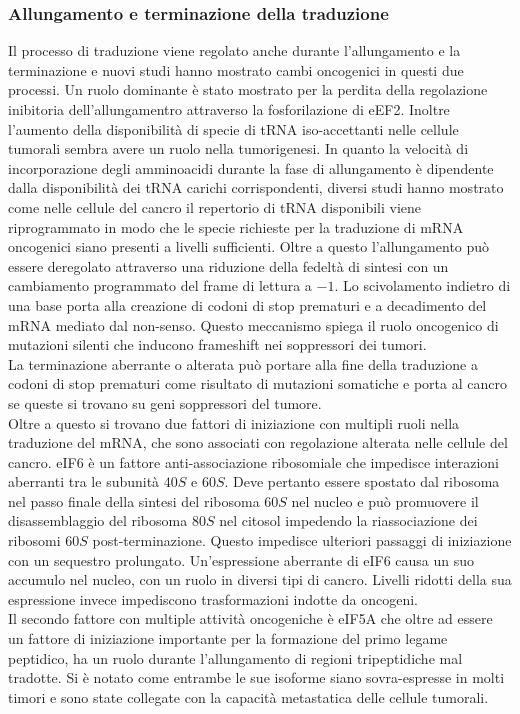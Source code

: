 		\subsubsection{Allungamento e terminazione della traduzione}
		Il processo di traduzione viene regolato anche durante l'allungamento e la terminazione e nuovi studi hanno mostrato cambi oncogenici in questi due processi.
		Un ruolo dominante \`e stato mostrato per la perdita della regolazione inibitoria dell'allungamentro attraverso la fosforilazione di eEF2.
		Inoltre l'aumento della disponibilit\`a di specie di tRNA iso-accettanti nelle cellule tumorali sembra avere un ruolo nella tumorigenesi.
		In quanto la velocit\`a di incorporazione degli amminoacidi durante la fase di allungamento \`e dipendente dalla disponibilit\`a dei tRNA carichi corrispondenti, diversi studi hanno mostrato come nelle cellule del cancro il repertorio di tRNA disponibili viene riprogrammato in modo che le specie richieste per la traduzione di mRNA oncogenici siano presenti a livelli sufficienti.
		Oltre a questo l'allungamento pu\`o essere deregolato attraverso una riduzione della fedelt\`a di sintesi con un cambiamento programmato del frame di lettura a $-1$.
		Lo scivolamento indietro di una base porta alla creazione di codoni di stop prematuri e a decadimento del mRNA mediato dal non-senso.
		Questo meccanismo spiega il ruolo oncogenico di mutazioni silenti che inducono frameshift nei soppressori dei tumori.\\
		La terminazione aberrante o alterata pu\`o portare alla fine della traduzione a codoni di stop prematuri come risultato di mutazioni somatiche e porta al cancro se queste si trovano su geni soppressori del tumore.\\
		Oltre a questo si trovano due fattori di iniziazione con multipli ruoli nella traduzione del mRNA, che sono associati con regolazione alterata nelle cellule del cancro.
		eIF6 \`e un fattore anti-associazione ribosomiale che impedisce interazioni aberranti tra le subunit\`a $40S$ e $60S$.
		Deve pertanto essere spostato dal ribosoma nel passo finale della sintesi del ribosoma $60S$ nel nucleo e pu\`o promuovere il disassemblaggio del ribosoma $80S$ nel citosol impedendo la riassociazione dei ribosomi $60S$ post-terminazione.
		Questo impedisce ulteriori passaggi di iniziazione con un sequestro prolungato.
		Un'espressione aberrante di eIF6 causa un suo accumulo nel nucleo, con un ruolo in diversi tipi di cancro.
		Livelli ridotti della sua espressione invece impediscono trasformazioni indotte da oncogeni.\\
		Il secondo fattore con multiple attivit\`a oncogeniche \`e eIF5A che oltre ad essere un fattore di iniziazione importante per la formazione del primo legame peptidico, ha un ruolo durante l'allungamento di regioni tripeptidiche mal tradotte.
		Si \`e notato come entrambe le sue isoforme siano sovra-espresse in molti timori e sono state collegate con la capacit\`a metastatica delle cellule tumorali.

